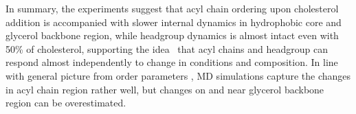 \documentclass[journal=jcisd8,manuscript=article,layout=twocolumn]{achemso}
\begin{document}


In summary, the experiments suggest that acyl chain ordering upon cholesterol addition is accompanied
with slower internal dynamics in hydrophobic core and glycerol backbone region, while headgroup dynamics is almost
intact even with 50\% of cholesterol, supporting the idea~\cite{Antila:2020a} that acyl chains and headgroup can respond
almost independently to change in conditions and composition.
In line with general picture from order parameters \cite{Ollila:2016a}, MD simulations capture the changes
in acyl chain region rather well, but changes on and near glycerol backbone region can be overestimated.
\end{document}
